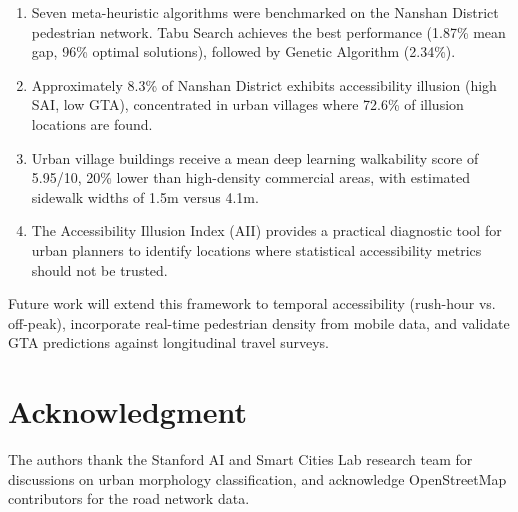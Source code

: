 \documentclass[journal]{IEEEtran}
\begin{document}
\begin{enumerate}
    \item Seven meta-heuristic algorithms were benchmarked on the Nanshan District pedestrian network. Tabu Search achieves the best performance (1.87\% mean gap, 96\% optimal solutions), followed by Genetic Algorithm (2.34\%).
    \item Approximately 8.3\% of Nanshan District exhibits accessibility illusion (high SAI, low GTA), concentrated in urban villages where 72.6\% of illusion locations are found.
    \item Urban village buildings receive a mean deep learning walkability score of 5.95/10, 20\% lower than high-density commercial areas, with estimated sidewalk widths of 1.5m versus 4.1m.
    \item The Accessibility Illusion Index (AII) provides a practical diagnostic tool for urban planners to identify locations where statistical accessibility metrics should not be trusted.
\end{enumerate}

Future work will extend this framework to temporal accessibility (rush-hour vs. off-peak), incorporate real-time pedestrian density from mobile data, and validate GTA predictions against longitudinal travel surveys.

\section*{Acknowledgment}
The authors thank the Stanford AI and Smart Cities Lab research team for discussions on urban morphology classification, and acknowledge OpenStreetMap contributors for the road network data.
\end{document}

